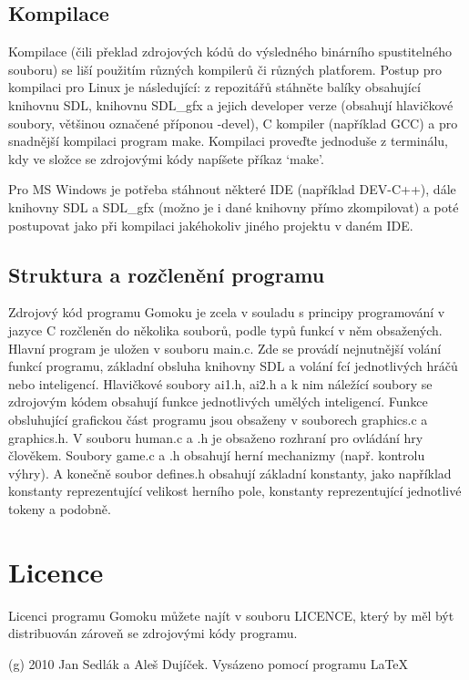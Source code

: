 \documentclass[a4paper,11pt,titlepage]{article}
\begin{document}
\subsection{Kompilace}
Kompilace (čili překlad zdrojových kódů do výsledného binárního spustitelného souboru) se liší použitím různých kompilerů či různých platforem. Postup pro kompilaci pro Linux je následující: z repozitářů stáhněte balíky obsahující knihovnu SDL, knihovnu SDL\_gfx a jejich developer verze (obsahují hlavičkové soubory, většinou označené příponou -devel), C kompiler (například GCC) a pro snadnější kompilaci program make. Kompilaci proveďte jednoduše z terminálu, kdy ve složce se zdrojovými kódy napíšete příkaz `make'. 

Pro MS Windows je potřeba stáhnout některé IDE (například DEV-C++), dále knihovny SDL a SDL\_gfx (možno je i dané knihovny přímo zkompilovat) a poté postupovat jako při kompilaci jakéhokoliv jiného projektu v daném IDE.
\subsection{Struktura a rozčlenění programu}
Zdrojový kód programu Gomoku je zcela v souladu s principy programování v jazyce C rozčleněn do několika souborů, podle typů funkcí v něm ob\-sa\-že\-ných. Hlavní program je uložen v souboru main.c. Zde se provádí nejnutnější volání funkcí programu, základní obsluha knihovny SDL a volání fcí jednotlivých hráčů nebo inteligencí. Hlavičkové soubory ai1.h, ai2.h a k nim náležící soubory se zdrojovým kódem obsahují funkce jednotlivých umělých inteligencí. Funkce obsluhující grafickou část programu jsou obsaženy v souborech graphics.c a graphics.h. V souboru human.c a .h je obsaženo rozhraní pro ovládání hry člověkem. Soubory game.c a .h obsahují herní mechanizmy (např. kontrolu výhry). A konečně soubor defines.h obsahují základní konstanty, jako například konstanty reprezentující velikost herního pole, konstanty reprezentující jednotlivé tokeny a podobně.
\section{Licence}
Licenci programu Gomoku můžete najít v souboru LICENCE, který by měl být distribuován zároveň se zdrojovými kódy programu.

(g) 2010 Jan Sedlák a Aleš Dujíček. Vysázeno pomocí programu \LaTeX
\end{document}
